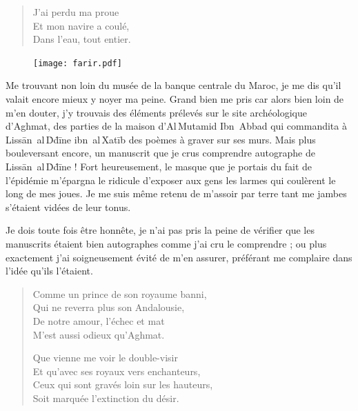 \begin{verse}
J’ai perdu ma proue\\
Et mon navire a coulé,\\
Dans l’eau, tout entier.
\end{verse}

\begin{figure}[h]
\centering
\texttt{[image: farir.pdf]}
\captionsetup{labelformat=empty}
\caption[Idéotexte du  (\textarabic{خالي})]{}
\end{figure}

\begin{prose}
Me trouvant non loin du musée de la banque centrale du Maroc, je me dis qu’il valait encore mieux y noyer ma peine. Grand bien me pris car alors  bien loin de m’en douter, j’y trouvais des éléments prélevés sur le site archéologique d’Aghmat, des parties de la maison d’Al\,Mutamid Ibn~Abbad qui commandita à Lissān~al\,Ḋḋīne ibn~al\,Xatīb des poèmes à graver sur ses murs. Mais plus bouleversant encore, un manuscrit que je crus comprendre autographe de Lissān~al\,Ḋḋīne ! Fort heureusement, le masque que je portais du fait de l’épidémie m’épargna le ridicule d’exposer aux gens les larmes qui coulèrent le long de mes joues. Je me suis même retenu de m’assoir par terre tant me jambes s’étaient vidées de leur tonus.

Je dois toute fois être honnête, je n’ai pas pris la peine de vérifier que les manuscrits étaient bien autographes comme j’ai cru le comprendre ; ou plus exactement j’ai soigneusement évité de m’en assurer, préférant me complaire dans l’idée qu’ils l’étaient.
\end{prose}

\begin{verse}
Comme un prince de son royaume banni,\\
Qui ne reverra plus  son Andalousie,\\
De notre amour, l’échec et mat\\
M’est aussi odieux qu’Aghmat.

Que vienne me voir le double-visir\\
Et qu’avec ses royaux vers enchanteurs,\\
Ceux qui sont gravés loin sur les hauteurs,\\
Soit marquée l’extinction du désir.
\end{verse}


